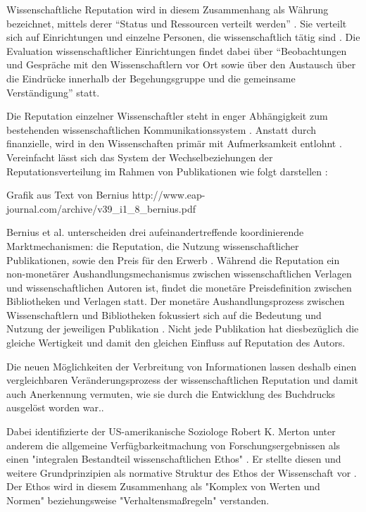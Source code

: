 Wissenschaftliche Reputation wird in diesem Zusammenhang als Währung bezeichnet, mittels derer “Status und Ressourcen verteilt werden” \cite{hanekop_2006}. Sie verteilt sich auf Einrichtungen und einzelne Personen, die wissenschaftlich tätig sind \cite{suchen}. Die Evaluation wissenschaftlicher Einrichtungen findet dabei über “Beobachtungen und Gespräche mit den Wissenschaftlern vor Ort sowie über den Austausch über die Eindrücke innerhalb der Begehungsgruppe und die gemeinsame Verständigung”\cite{Barl_sius_2008} statt.

Die Reputation einzelner Wissenschaftler steht in enger Abhängigkeit zum bestehenden wissenschaftlichen Kommunikationssystem \cite{suchen}. Anstatt durch finanzielle, wird in den Wissenschaften primär mit Aufmerksamkeit entlohnt \cite{suchen}. Vereinfacht lässt sich das System der Wechselbeziehungen der Reputationsverteilung im Rahmen von Publikationen wie folgt darstellen \cite{cite:21a}:

Grafik aus Text von Bernius
http://www.eap-journal.com/archive/v39_i1_8_bernius.pdf

Bernius et al. unterscheiden drei aufeinandertreffende koordinierende Marktmechanismen: die Reputation, die Nutzung wissenschaftlicher Publikationen, sowie den Preis für den Erwerb \cite{suchen}. Während die Reputation ein non-monetärer Aushandlungsmechanismus zwischen wissenschaftlichen Verlagen und wissenschaftlichen Autoren ist, findet die monetäre Preisdefinition zwischen Bibliotheken und Verlagen statt. Der monetäre Aushandlungsprozess zwischen Wissenschaftlern und Bibliotheken fokussiert sich auf die Bedeutung und Nutzung der jeweiligen Publikation \cite{cite:21a}. Nicht jede Publikation hat diesbezüglich die gleiche Wertigkeit \cite{suchen} und damit den gleichen Einfluss auf Reputation des Autors.

Die neuen Möglichkeiten der Verbreitung von Informationen lassen deshalb einen vergleichbaren Veränderungsprozess der wissenschaftlichen Reputation und damit auch Anerkennung vermuten, wie sie durch die Entwicklung des Buchdrucks ausgelöst worden war.\cite{hanekop_2006}.

Dabei identifizierte der US-amerikanische Soziologe Robert K. Merton unter anderem die allgemeine Verfügbarkeitmachung von Forschungsergebnissen als einen "integralen Bestandteil wissenschaftlichen Ethos" \cite{Fangerau_2014}. Er stellte diesen und weitere Grundprinzipien als normative Struktur des Ethos der Wissenschaft vor \cite{Merton_1985}. Der Ethos wird in diesem Zusammenhang als "Komplex von Werten und Normen"\cite{suchen} beziehungsweise "Verhaltensmaßregeln"\cite{suchen} verstanden.

